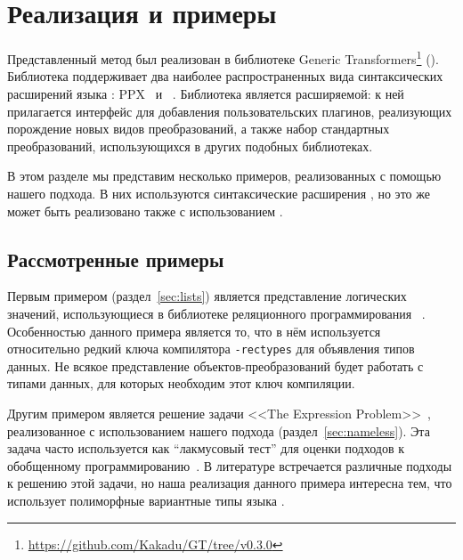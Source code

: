 \section{Реализация и примеры}
\label{sec:Evaluation}

Представленный метод был реализован в библиотеке Generic Transformers\footnote{\url{https://github.com/Kakadu/GT/tree/v0.3.0}} (\GT). Библиотека  поддерживает два наиболее распространенных вида синтаксических расширений языка \ocaml{}: \textsc{PPX}~\cite{PPXLib} и \camlpfive~\cite{camlp5}. Библиотека \GT{} является расширяемой: к ней прилагается интерфейс для добавления пользовательских плагинов, реализующих порождение новых видов преобразований, а также набор стандартных преобразований, использующихся в других подобных библиотеках.


В этом разделе мы представим несколько примеров, реализованных с помощью нашего подхода. В них используются синтаксические расширения \camlpfive{}, но это же может быть реализовано также с использованием \PPX{}. %

\subsection{Рассмотренные примеры}

Первым примером (раздел~\ref{sec:lists}) является представление логических значений, использующиеся в  библиотеке реляционного программирования \OCanren{}~\cite{OCanren}. Особенностью данного примера является то, что в нём используется относительно редкий ключа компилятора \texttt{-rectypes} для объявления типов данных. Не всякое представление объектов-преобразований будет работать с типами данных, для которых необходим этот ключ компиляции.

Другим примером является решение задачи <<The Expression Problem>>~\cite{ExpressionProblem}, реализованное с использованием нашего подхода (раздел~\ref{sec:nameless}). Эта задача часто используется как ``лакмусовый тест'' для оценки подходов к обобщенному программированию~\cite{ObjectAlgebras,ALaCarte}. В литературе встречается различные подходы к решению этой задачи, но наша реализация данного примера интересна тем, что использует полиморфные вариантные типы языка \ocaml{}.


